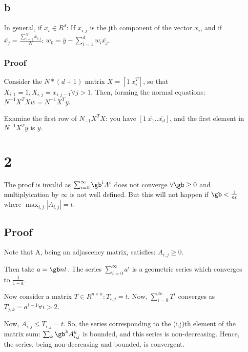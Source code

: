 \documentclass{article}
\begin{document}
\subsection{b}
In general, if $x_{i}\in R^{d}$: If $x_{i,j}$ is the jth component of the vector $x_{i}$, and if $\bar{x_{j}} = \frac{\sum_{i=1}^{N}x_{i,j}}{N}$: $w_{0} = \bar{y} - \sum_{i=1}^{d} w_{i}\bar{x_{j}}$.

\subsubsection{Proof}
Consider the $N*(d+1)$ matrix $X = [1\ x_{i}^{T}]$, so that $X_{i,1} = 1, X_{i,j} = x_{i,j-1} \forall j>1$. Then, forming the normal equations: $N^{-1}X^{T}Xw = N^{-1}X^{T}y$.

Examine the first row of $N_{-1}X^{T}X$: you have $[1\ \bar{x_{1}} .. \bar{x_{d}}]$, and the first element in $N^{-1}X^{T}y$ is $\bar{y}$.

\section{2}
The proof is invalid as $\sum_{i=0}^{\infty} \gb^{i}A^{i}$ does not converge $\forall \gb \geq 0$ and multiplyication by $\infty$ is not well defined. But this will not happen if $\gb < \frac{1}{nt}$ where $\max_{i,j}|A_{i,j}| = t$.

\subsection{Proof}
Note that A, being an adjascency matrix, satisfies: $A_{i,j} \geq 0$.

Then take $a = \gb nt$. The series $\sum_{i=0}^{\infty}a^{i}$ is a geometric series which converges to $\frac{1}{1-a}$.

Now consider a matrix $T \in R^{n \times n}: T_{i,j} = t$. Now, $\sum_{i=0}^{\infty} T^{i}$ converges as $T^{i}_{j,k} = a^{i-1} \forall i>2$.

Now, $A_{i,j} \leq T_{i,j} = t$. So, the series corresponding to the (i,j)th element of the matrix sum:  $\sum_{k} \gb^{k} A^{k}_{i,j}$ is bounded, and this series is non-decreasing. Hence, the series, being non-decreasing and bounded, is convergent.
\end{document}

